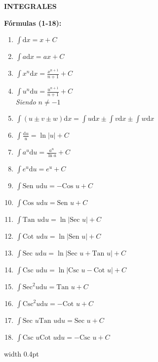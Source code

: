 \documentclass[10pt, letterpaper, landscape]{article}
\newcommand{\dd}{\mathrm{d}}
\begin{document}
\newpage

\begin{minipage}[t]{8.3cm}
    \centerline{\textbf{\large INTEGRALES}}
    \vspace{0.1cm}

    \textbf{Fórmulas (1-18):}
    \begin{enumerate}[label=\arabic*., nosep, itemsep=1pt, leftmargin=15pt]
        \item $\int \dd x = x + C$
        \item $\int a \dd x = ax + C$
        \item $\int x^n \dd x = \frac{x^{n+1}}{n+1} + C$
        \item $\int u^n \dd u = \frac{u^{n+1}}{n+1} + C$ \\ \textit{\scriptsize Siendo $n \neq -1$}
        \item $\int (u \pm v \pm w) \dd x = \int u\dd x \pm \int v\dd x \pm \int w\dd x$
        \item $\int \frac{\dd u}{u} = \ln|u| + C$
        \item $\int a^u \dd u = \frac{a^u}{\ln a} + C$
        \item $\int e^u \dd u = e^u + C$
        \item $\int \text{Sen } u \dd u = -\text{Cos } u + C$
        \item $\int \text{Cos } u \dd u = \text{Sen } u + C$
        \item $\int \text{Tan } u \dd u = \ln|\text{Sec } u| + C$
        \item $\int \text{Cot } u \dd u = \ln|\text{Sen } u| + C$
        \item $\int \text{Sec } u \dd u = \ln|\text{Sec } u + \text{Tan } u| + C$
        \item $\int \text{Csc } u \dd u = \ln|\text{Csc } u - \text{Cot } u| + C$
        \item $\int \text{Sec}^2 u \dd u = \text{Tan } u + C$
        \item $\int \text{Csc}^2 u \dd u = -\text{Cot } u + C$
        \item $\int \text{Sec } u \text{Tan } u \dd u = \text{Sec } u + C$
        \item $\int \text{Csc } u \text{Cot } u \dd u = -\text{Csc } u + C$
    \end{enumerate}
\end{minipage}%
\hfill
\vrule width 0.4pt
\hfill
\end{document}
